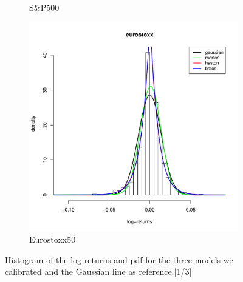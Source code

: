 \begin{figure}
\begin{subfigure}{0.44\textwidth}
		\caption{S\&P500}
	\end{subfigure}
	\begin{subfigure}{0.44\textwidth}
		\centering
		\includegraphics[width=\linewidth]{Images/hist_eurostoxx.pdf}
		\caption{Eurostoxx50}
	\end{subfigure}
	\caption[Histrogram and densities of the results (1/3)]{Histogram of the log-returns and pdf for the three models we calibrated and the Gaussian line as reference.[1/3]}
	\label{fig:hist_1}
	
\end{figure}





